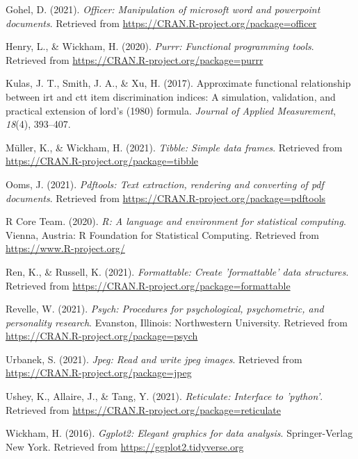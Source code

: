 \documentclass[
  english,
  man]{apa6}
\begin{document}
\leavevmode\hypertarget{ref-R-officer}{}%
Gohel, D. (2021). \emph{Officer: Manipulation of microsoft word and powerpoint documents}. Retrieved from \url{https://CRAN.R-project.org/package=officer}

\leavevmode\hypertarget{ref-R-purrr}{}%
Henry, L., \& Wickham, H. (2020). \emph{Purrr: Functional programming tools}. Retrieved from \url{https://CRAN.R-project.org/package=purrr}

\leavevmode\hypertarget{ref-kulas2017approximate}{}%
Kulas, J. T., Smith, J. A., \& Xu, H. (2017). Approximate functional relationship between irt and ctt item discrimination indices: A simulation, validation, and practical extension of lord's (1980) formula. \emph{Journal of Applied Measurement}, \emph{18}(4), 393--407.

\leavevmode\hypertarget{ref-R-tibble}{}%
Müller, K., \& Wickham, H. (2021). \emph{Tibble: Simple data frames}. Retrieved from \url{https://CRAN.R-project.org/package=tibble}

\leavevmode\hypertarget{ref-R-pdftools}{}%
Ooms, J. (2021). \emph{Pdftools: Text extraction, rendering and converting of pdf documents}. Retrieved from \url{https://CRAN.R-project.org/package=pdftools}

\leavevmode\hypertarget{ref-R-base}{}%
R Core Team. (2020). \emph{R: A language and environment for statistical computing}. Vienna, Austria: R Foundation for Statistical Computing. Retrieved from \url{https://www.R-project.org/}

\leavevmode\hypertarget{ref-R-formattable}{}%
Ren, K., \& Russell, K. (2021). \emph{Formattable: Create 'formattable' data structures}. Retrieved from \url{https://CRAN.R-project.org/package=formattable}

\leavevmode\hypertarget{ref-R-psych}{}%
Revelle, W. (2021). \emph{Psych: Procedures for psychological, psychometric, and personality research}. Evanston, Illinois: Northwestern University. Retrieved from \url{https://CRAN.R-project.org/package=psych}

\leavevmode\hypertarget{ref-R-jpeg}{}%
Urbanek, S. (2021). \emph{Jpeg: Read and write jpeg images}. Retrieved from \url{https://CRAN.R-project.org/package=jpeg}

\leavevmode\hypertarget{ref-R-reticulate}{}%
Ushey, K., Allaire, J., \& Tang, Y. (2021). \emph{Reticulate: Interface to 'python'}. Retrieved from \url{https://CRAN.R-project.org/package=reticulate}

\leavevmode\hypertarget{ref-R-ggplot2}{}%
Wickham, H. (2016). \emph{Ggplot2: Elegant graphics for data analysis}. Springer-Verlag New York. Retrieved from \url{https://ggplot2.tidyverse.org}
\end{document}
